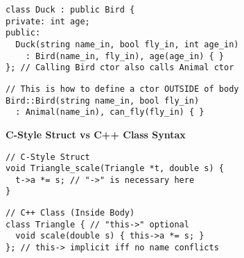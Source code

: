 \documentclass[7pt, twocolumn]{extarticle}
\begin{document}
\begin{small}
\begin{minipage}[h]{5.4cm}
\begin{tcolorbox}
{\begin{lstlisting}[style = mystyle]
class Duck : public Bird {
private: int age;
public: 
  Duck(string name_in, bool fly_in, int age_in)
    : Bird(name_in, fly_in), age(age_in) { }
}; // Calling Bird ctor also calls Animal ctor
\end{lstlisting}
}
\tcblower
\begin{lstlisting}[style = mystyle]
// This is how to define a ctor OUTSIDE of body
Bird::Bird(string name_in, bool fly_in)
  : Animal(name_in), can_fly(fly_in) { }
\end{lstlisting}
   \end{tcolorbox}
    \end{minipage}
    \hspace{0pt}
   \begin{minipage}[h]{4.8cm} \small 
      \textcolor{headcolor}{\textbf{C-Style Struct vs C++ Class Syntax}}
      \vspace{-1pt}
      \begin{tcolorbox}[top=-5pt,bottom=-5pt,middle=-5pt,left=-1pt,right=-1pt,center title,toptitle=-0.6mm,
  bottomtitle=-0.6mm,boxrule=0.5pt,arc=0pt,adjusted title={\footnotesize ADT Function Definition},fonttitle=\large\sffamily\bfseries]
              {
              \begin{lstlisting}[style = mystyle]
// C-Style Struct
void Triangle_scale(Triangle *t, double s) {
  t->a *= s; // "->" is necessary here
}

\end{lstlisting}
}
\tcblower
{
\begin{lstlisting}[style = mystyle]
// C++ Class (Inside Body)
class Triangle { // "this->" optional
  void scale(double s) { this->a *= s; } 
}; // this-> implicit iff no name conflicts


\end{lstlisting}}
\end{tcolorbox}
\end{minipage}
\end{small}
\end{document}
